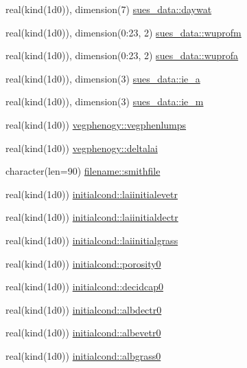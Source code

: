 \begin{DoxyCompactItemize}
\item 
real(kind(1d0)), dimension(7) \hyperlink{namespacesues__data_a55dbeb9abd22aa41d295c4348a2fb6de}{sues\+\_\+data\+::daywat}
\item 
real(kind(1d0)), dimension(0\+:23, 2) \hyperlink{namespacesues__data_a5926d0d936d383d4f839d9e7bcc65f48}{sues\+\_\+data\+::wuprofm}
\item 
real(kind(1d0)), dimension(0\+:23, 2) \hyperlink{namespacesues__data_a8b58e7f44021d419ca3e9da1c2a8db49}{sues\+\_\+data\+::wuprofa}
\item 
real(kind(1d0)), dimension(3) \hyperlink{namespacesues__data_a1ddda58bf0af48716e6e89efefa42b47}{sues\+\_\+data\+::ie\+\_\+a}
\item 
real(kind(1d0)), dimension(3) \hyperlink{namespacesues__data_acc07bf45b728dde4f2c1e0063f79808e}{sues\+\_\+data\+::ie\+\_\+m}
\item 
real(kind(1d0)) \hyperlink{namespacevegphenogy_a05592f6d02152feabac40f31a5c9fd61}{vegphenogy\+::vegphenlumps}
\item 
real(kind(1d0)) \hyperlink{namespacevegphenogy_a4eb57eeebce5733b3d0392c0de2d5c73}{vegphenogy\+::deltalai}
\item 
character(len=90) \hyperlink{namespacefilename_aa95ca3ddcb260b59335c2c461f1820d0}{filename\+::smithfile}
\item 
real(kind(1d0)) \hyperlink{namespaceinitialcond_a8c1600d5904472dceded21c657d2e5f9}{initialcond\+::laiinitialevetr}
\item 
real(kind(1d0)) \hyperlink{namespaceinitialcond_a709658b9104b286e2b94a4235cd99d1e}{initialcond\+::laiinitialdectr}
\item 
real(kind(1d0)) \hyperlink{namespaceinitialcond_a5af43c64376b810daa4dce52bcea767b}{initialcond\+::laiinitialgrass}
\item 
real(kind(1d0)) \hyperlink{namespaceinitialcond_a9c4cad07b3a26a8a84712c2e39ec57d1}{initialcond\+::porosity0}
\item 
real(kind(1d0)) \hyperlink{namespaceinitialcond_a09a143cb4c78f0b46e310f6eed172727}{initialcond\+::decidcap0}
\item 
real(kind(1d0)) \hyperlink{namespaceinitialcond_a4adfa02ebcb41c5e25a3afaa2fbc79bd}{initialcond\+::albdectr0}
\item 
real(kind(1d0)) \hyperlink{namespaceinitialcond_ad69d04d9c931b44b5494a8ca83f02a17}{initialcond\+::albevetr0}
\item 
real(kind(1d0)) \hyperlink{namespaceinitialcond_a1690b92f7ee51436213bdce6c0d70dc2}{initialcond\+::albgrass0}
\item 

\end{DoxyCompactItemize}
